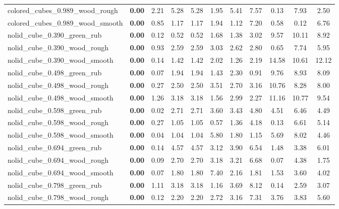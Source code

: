 \begin{table}[H]
{\begin{tabular}{l cccccccccc}
        colored\_cubes\_0.989\_wood\_rough & \textbf{0.00} & 2.21 & 5.28 & 5.28 & 1.95 & 5.41 & 7.57 & 0.13 & 7.93 & 2.50 \\
        colored\_cubes\_0.989\_wood\_smooth & \textbf{0.00} & 0.85 & 1.17 & 1.17 & 1.94 & 1.12 & 7.20 & 0.58 & 0.12 & 6.76 \\
        nolid\_cube\_0.390\_green\_rub & \textbf{0.00} & 0.12 & 0.52 & 0.52 & 1.68 & 1.38 & 3.02 & 9.57 & 10.11 & 8.92 \\
        nolid\_cube\_0.390\_wood\_rough & \textbf{0.00} & 0.93 & 2.59 & 2.59 & 3.03 & 2.62 & 2.80 & 0.65 & 7.74 & 5.95 \\
        nolid\_cube\_0.390\_wood\_smooth & \textbf{0.00} & 0.14 & 1.42 & 1.42 & 2.02 & 1.26 & 2.19 & 14.58 & 10.61 & 12.12 \\
        nolid\_cube\_0.498\_green\_rub & \textbf{0.00} & 0.07 & 1.94 & 1.94 & 1.43 & 2.30 & 0.91 & 9.76 & 8.93 & 8.09 \\
        nolid\_cube\_0.498\_wood\_rough & \textbf{0.00} & 0.27 & 2.50 & 2.50 & 3.51 & 2.70 & 3.16 & 10.76 & 8.28 & 8.00 \\
        nolid\_cube\_0.498\_wood\_smooth & \textbf{0.00} & 1.26 & 3.18 & 3.18 & 1.56 & 2.99 & 2.27 & 11.16 & 10.77 & 9.54 \\
        nolid\_cube\_0.598\_green\_rub & \textbf{0.00} & 0.02 & 2.71 & 2.71 & 3.60 & 3.43 & 4.80 & 4.51 & 6.46 & 4.49 \\
        nolid\_cube\_0.598\_wood\_rough & \textbf{0.00} & 0.27 & 1.05 & 1.05 & 0.57 & 1.36 & 4.18 & 0.13 & 6.61 & 5.14 \\
        nolid\_cube\_0.598\_wood\_smooth & \textbf{0.00} & 0.04 & 1.04 & 1.04 & 5.80 & 1.80 & 1.15 & 5.69 & 8.02 & 4.46 \\
        nolid\_cube\_0.694\_green\_rub & \textbf{0.00} & 0.14 & 4.57 & 4.57 & 3.12 & 3.90 & 6.54 & 1.48 & 3.38 & 6.01 \\
        nolid\_cube\_0.694\_wood\_rough & \textbf{0.00} & 0.09 & 2.70 & 2.70 & 3.18 & 3.21 & 6.68 & 0.07 & 4.38 & 1.75 \\
        nolid\_cube\_0.694\_wood\_smooth & \textbf{0.00} & 0.07 & 1.80 & 1.80 & 7.40 & 2.16 & 1.81 & 1.53 & 3.60 & 4.02 \\
        nolid\_cube\_0.798\_green\_rub & \textbf{0.00} & 1.11 & 3.18 & 3.18 & 1.16 & 3.69 & 8.12 & 0.14 & 2.59 & 3.07 \\
        nolid\_cube\_0.798\_wood\_rough & \textbf{0.00} & 0.12 & 2.20 & 2.20 & 2.72 & 3.16 & 7.31 & 3.76 & 3.83 & 5.60 \\

\end{tabular}}
\end{table}
